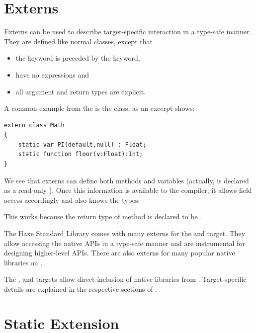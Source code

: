 \documentclass{haxe}
\begin{document}
\section{Externs}
\label{lf-externs}

Externs can be used to describe target-specific interaction in a type-safe manner. They are defined like normal classes, except that

\begin{itemize}
	\item the  keyword is preceded by the  keyword,
	\item {} have no expressions and
	\item all argument and return types are explicit.
\end{itemize}

A common example from the  is the  class, as an excerpt shows:

\begin{lstlisting}
extern class Math
{
	static var PI(default,null) : Float;
	static function floor(v:Float):Int;
}
\end{lstlisting}

We see that externs can define both methods and variables (actually,  is declared as a read-only ). Once this information is available to the compiler, it allows field access accordingly and also knows the types:


This works because the return type of method  is declared to be .

The Haxe Standard Library comes with many externs for the  and  target. They allow accessing the native APIs in a type-safe manner and are instrumental for designing higher-level APIs. There are also externs for many popular native libraries on .

The ,  and  targets allow direct inclusion of native libraries from . Target-specific details are explained in the respective sections of .




\section{Static Extension}
\label{lf-static-extension}
\end{document}

